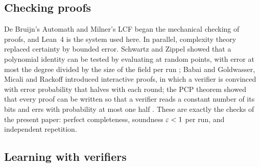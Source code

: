 \subsection{Checking proofs}

De Bruijn's Automath \cite{dB70} and Milner's LCF \cite{GMW79} began the mechanical checking of proofs, and Lean~4 \cite{MU21} is the system used here. In parallel, complexity theory replaced certainty by bounded error. Schwartz and Zippel showed that a polynomial identity can be tested by evaluating at random points, with error at most the degree divided by the size of the field per run \cite{Sch80,Zip79}; Babai \cite{Bab85} and Goldwasser, Micali and Rackoff \cite{GMR89} introduced interactive proofs, in which a verifier is convinced with error probability that halves with each round; the PCP theorem showed that every proof can be written so that a verifier reads a constant number of its bits and errs with probability at most one half \cite{AS98,ALM98}. These are exactly the checks of the present paper: perfect completeness, soundness $\varepsilon<1$ per run, and independent repetition.

\subsection{Learning with verifiers}

